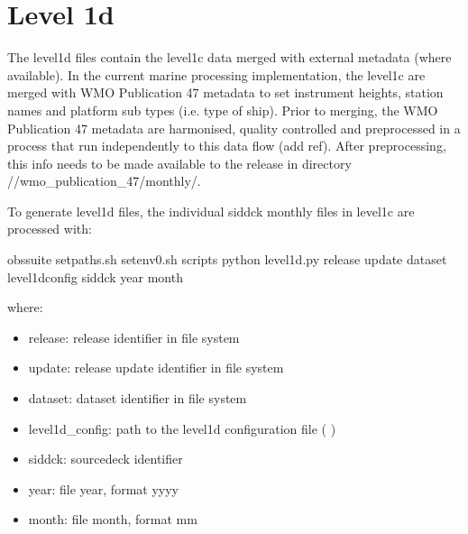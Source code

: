 \documentclass[letterpaper,10pt,english]{sphinxmanual}
\begin{document}
\chapter{Level 1d}
\label{\detokenize{index:level-1d}}
The level1d files contain the level1c data merged with external metadata (where
available). In the current marine processing implementation, the level1c are
merged with WMO Publication 47 metadata to set instrument heights, station names
and platform sub types (i.e. type of ship). Prior to merging, the WMO
Publication 47 metadata are harmonised, quality controlled and pre\sphinxhyphen{}processed in
a process that run independently to this data flow (add ref). After
pre\sphinxhyphen{}processing, this info needs to be made available to the release in directory
//wmo\_publication\_47/monthly/.

To generate level1d files, the individual sid\sphinxhyphen{}dck monthly files in level1c are
processed with:

\begin{sphinxVerbatim}[commandchars=\\\{\}]
 obs\PYGZhy{}suite
 setpaths.sh
 setenv0.sh
 scripts
python level1d.py  release update dataset level1d\PYGZus{}config sid\PYGZhy{}dck year month
\end{sphinxVerbatim}

where:
\begin{itemize}
\item {}
release: release identifier in file system

\item {}
update: release update identifier in file system

\item {}
dataset: dataset identifier in file system

\item {}
level1d\_config: path to the level1d configuration file ( {\hyperref[\detokenize{index:level1d-config-file}]{}})

\item {}
sid\sphinxhyphen{}dck: source\sphinxhyphen{}deck identifier

\item {}
year: file year, format yyyy

\item {}
month: file month, format mm

\end{itemize}
\end{document}
